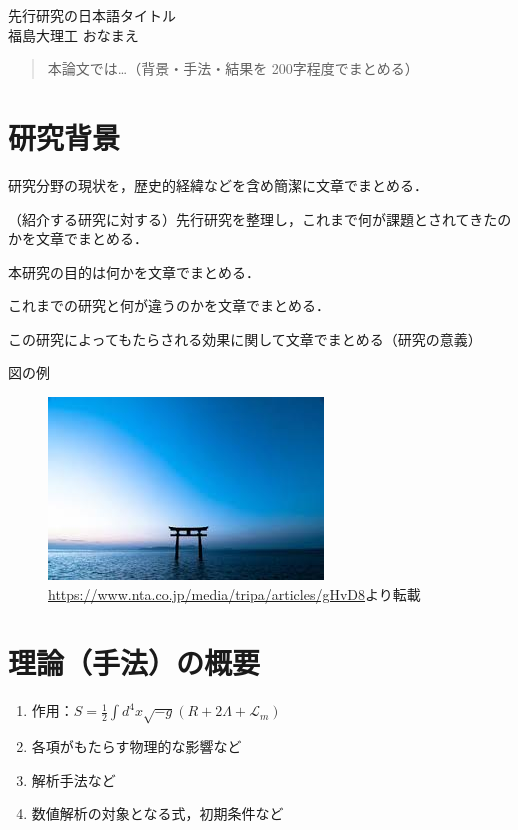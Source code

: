 \documentclass[12pt,a4paper]{jsarticle}
\begin{document}
\vspace{-5pt}
\begin{center}
{\gt \Large 先行研究の日本語タイトル\cite{G_ng_r_2021} }\\[14pt]

{\gt \large 福島大理工 おなまえ}\\[5pt]

\end{center}

\vspace{10pt}

\begin{abstract}
    本論文では…（背景・手法・結果を 200字程度でまとめる）
\end{abstract}

\section{研究背景}
\begin{description}[leftmargin=*]
    \item[分野の状況] 研究分野の現状を，歴史的経緯などを含め簡潔に文章でまとめる．
    \item[分野の課題]（紹介する研究に対する）先行研究を整理し，これまで何が課題とされてきたのかを文章でまとめる．
    \item[研究の目的] 本研究の目的は何かを文章でまとめる．
    \item[新規性] これまでの研究と何が違うのかを文章でまとめる．
    \item[期待される効果] この研究によってもたらされる効果に関して文章でまとめる（研究の意義）
\end{description}
図の例
\begin{figure}[htbp]
    \centering
    \label{fig:research_goal}
    \includegraphics[width=0.5\linewidth]{./fig_1.png}
    \caption[転載元サイト]{\url{https://www.nta.co.jp/media/tripa/articles/gHvD8}より転載}
\end{figure}

\section{理論（手法）の概要}
\begin{enumerate}[leftmargin=*]
  \item 作用：$S = \frac{1}{2} \int d^4 x \sqrt{-g} \left( R + 2\Lambda + \mathcal{L}_m \right)$
  \item 各項がもたらす物理的な影響など
  \item 解析手法など
  \item 数値解析の対象となる式，初期条件など
\end{enumerate}
\end{document}
